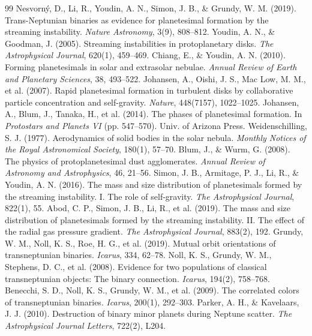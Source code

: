 \documentclass[11pt,a4paper]{article}
\begin{document}
\begin{thebibliography}{99}
 Nesvorn\'y, D., Li, R., Youdin, A. N., Simon, J. B., \& Grundy, W. M. (2019). Trans-Neptunian binaries as evidence for planetesimal formation by the streaming instability. \textit{Nature Astronomy}, 3(9), 808--812.
 Youdin, A. N., \& Goodman, J. (2005). Streaming instabilities in protoplanetary disks. \textit{The Astrophysical Journal}, 620(1), 459--469.
 Chiang, E., \& Youdin, A. N. (2010). Forming planetesimals in solar and extrasolar nebulae. \textit{Annual Review of Earth and Planetary Sciences}, 38, 493--522.
 Johansen, A., Oishi, J. S., Mac Low, M. M., et al. (2007). Rapid planetesimal formation in turbulent disks by collaborative particle concentration and self-gravity. \textit{Nature}, 448(7157), 1022--1025.
 Johansen, A., Blum, J., Tanaka, H., et al. (2014). The phases of planetesimal formation. In \textit{Protostars and Planets VI} (pp. 547--570). Univ. of Arizona Press.
 Weidenschilling, S. J. (1977). Aerodynamics of solid bodies in the solar nebula. \textit{Monthly Notices of the Royal Astronomical Society}, 180(1), 57--70.
 Blum, J., \& Wurm, G. (2008). The physics of protoplanetesimal dust agglomerates. \textit{Annual Review of Astronomy and Astrophysics}, 46, 21--56.
 Simon, J. B., Armitage, P. J., Li, R., \& Youdin, A. N. (2016). The mass and size distribution of planetesimals formed by the streaming instability. I. The role of self-gravity. \textit{The Astrophysical Journal}, 822(1), 55.
 Abod, C. P., Simon, J. B., Li, R., et al. (2019). The mass and size distribution of planetesimals formed by the streaming instability. II. The effect of the radial gas pressure gradient. \textit{The Astrophysical Journal}, 883(2), 192.
 Grundy, W. M., Noll, K. S., Roe, H. G., et al. (2019). Mutual orbit orientations of transneptunian binaries. \textit{Icarus}, 334, 62--78.
 Noll, K. S., Grundy, W. M., Stephens, D. C., et al. (2008). Evidence for two populations of classical transneptunian objects: The binary connection. \textit{Icarus}, 194(2), 758--768.
 Benecchi, S. D., Noll, K. S., Grundy, W. M., et al. (2009). The correlated colors of transneptunian binaries. \textit{Icarus}, 200(1), 292--303.
 Parker, A. H., \& Kavelaars, J. J. (2010). Destruction of binary minor planets during Neptune scatter. \textit{The Astrophysical Journal Letters}, 722(2), L204.

\end{thebibliography}
\end{document}
